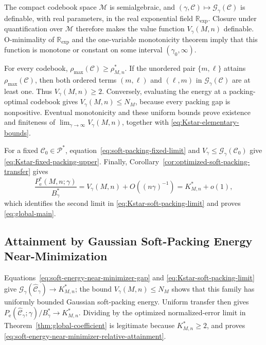 \documentclass[12pt,draftclsnofoot,onecolumn]{IEEEtran}
\newcommand{\R}{\mathbb{R}}
\newcommand{\cC}{\mathcal{C}}
\newcommand{\cG}{\mathcal{G}}
\newcommand{\cM}{\mathcal{M}}
\newcommand{\cP}{\mathcal{P}}
\newcommand{\Pe}{P_{\mathrm e}}
\theoremstyle{definition}
\begin{document}
\begin{IEEEproof}
The compact codebook space \(\cM\) is semialgebraic, and
\((\gamma,\cC)\mapsto\cG_\gamma(\cC)\) is definable, with real
parameters, in the real exponential field \(\R_{\exp}\).  Closure under
quantification over \(\cM\) therefore makes the value function
\(V_\gamma(M,n)\) definable.  O-minimality of \(\R_{\exp}\)
\cite{Wilkie1996} and the one-variable monotonicity theorem
\cite[Ch.~3, Sec.~1]{VanDenDries1998} imply that this function is monotone
or constant on some interval \((\gamma_0,\infty)\).

For every codebook, \(\rho_{\max}(\cC)\ge\rho^{\ast}_{M,n}\).  If the
unordered pair \(\{m,\ell\}\) attains \(\rho_{\max}(\cC)\), then both
ordered terms \((m,\ell)\) and \((\ell,m)\) in \(\cG_\gamma(\cC)\) are
at least one.  Thus \(V_\gamma(M,n)\ge2\).  Conversely, evaluating the
energy at a packing-optimal codebook gives
\(V_\gamma(M,n)\le N_M\), because every packing gap is nonpositive.
Eventual monotonicity and these uniform bounds prove existence and
finiteness of
\(\lim_{\gamma\to\infty}V_\gamma(M,n)\), together with
\eqref{eq:Kstar-elementary-bounds}.

For a fixed \(\cC_0\in\cP^{\ast}\),
equation~\eqref{eq:soft-packing-fixed-limit} and
\(V_\gamma\le\cG_\gamma(\cC_0)\) give
\eqref{eq:Kstar-fixed-packing-upper}.  Finally,
Corollary~\ref{cor:optimized-soft-packing-transfer} gives
\begin{equation*}
  \frac{\Pe^{\ast}(M,n;\gamma)}{B_\gamma^{\ast}}
  =V_\gamma(M,n)+O((n\gamma)^{-1})
  =K^{\ast}_{M,n}+o(1),
\end{equation*}
which identifies the second limit in
\eqref{eq:Kstar-soft-packing-limit} and proves \eqref{eq:global-main}.
\end{IEEEproof}

\subsection{Attainment by Gaussian Soft-Packing Energy Near-Minimization}

\begin{IEEEproof}
Equations~\eqref{eq:soft-energy-near-minimizer-gap} and
\eqref{eq:Kstar-soft-packing-limit} give
\(\cG_\gamma(\widehat{\cC}_\gamma)\to K^{\ast}_{M,n}\); the bound
\(V_\gamma(M,n)\le N_M\) shows that this family has uniformly bounded
Gaussian soft-packing energy.  Uniform
transfer then gives
\(\Pe(\widehat{\cC}_\gamma;\gamma)/B_\gamma^{\ast}\to
K^{\ast}_{M,n}\).  Dividing by the optimized normalized-error limit in
Theorem~\ref{thm:global-coefficient} is legitimate because
\(K^{\ast}_{M,n}\ge2\), and proves
\eqref{eq:soft-energy-near-minimizer-relative-attainment}.
\end{IEEEproof}
\end{document}
